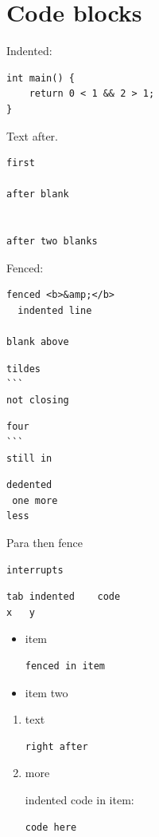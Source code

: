 \section{Code blocks}\label{code-blocks}

Indented:

\begin{verbatim}
int main() {
    return 0 < 1 && 2 > 1;
}
\end{verbatim}

Text after.

\begin{verbatim}
first

after blank


after two blanks
\end{verbatim}

Fenced:

\begin{verbatim}
fenced <b>&amp;</b>
  indented line

blank above
\end{verbatim}

\begin{verbatim}
tildes
```
not closing
\end{verbatim}

\begin{verbatim}
four
```
still in
\end{verbatim}

\begin{verbatim}
dedented
 one more
less
\end{verbatim}

Para then fence

\begin{verbatim}
interrupts
\end{verbatim}

\begin{verbatim}
tab indented    code
x   y
\end{verbatim}

\begin{itemize}
\item
  item

\begin{verbatim}
fenced in item
\end{verbatim}
\item
  item two
\end{itemize}

\begin{enumerate}
\def\labelenumi{\arabic{enumi}.}
\item
  text

\begin{verbatim}
right after
\end{verbatim}
\item
  more

  indented code in item:

\begin{verbatim}
code here
\end{verbatim}
\end{enumerate}
